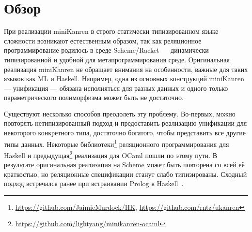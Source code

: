 
\section{Обзор}
\label{sec:relworks}

При реализации miniKanren в строго статически типизированном языке сложности возникают естественным образом, так как реляционное программирование родилось в среде Scheme/Racket --- динамически типизированной и удобной для метапрограммирования среде.
Оригинальная реализация miniKanren не обращает внимания на особенности, важные для таких языков как ML и Haskell.
Например, одна из основных конструкций miniKanren --- унификация --- обязана исполняться для разных данных и одного только параметрического полиморфизма может быть не достаточно.


Существуют несколько способов преодолеть эту проблему.
Во-первых, можно повторять нетипизированный подход и предоставить реализацию унификации для некоторого конкретного типа, достаточно богатого, чтобы представить все другие типы данных.
Некоторые библиотеки\footnote{\url{https://github.com/JaimieMurdock/HK}, \url{https://github.com/rntz/ukanren}} реляционного программирования для Haskell и предыдущая\footnote{\url{https://github.com/lightyang/minikanren-ocaml}} реализация для OCaml  пошли по этому пути.
В результате оригинальная реализация на Scheme может быть повторена со всей её краткостью, но реляционные спецификации  станут слабо типизированы.
Сходный подход встречался ранее при встраивании Prolog в  Haskell~\cite{PrologInHaskell}.


